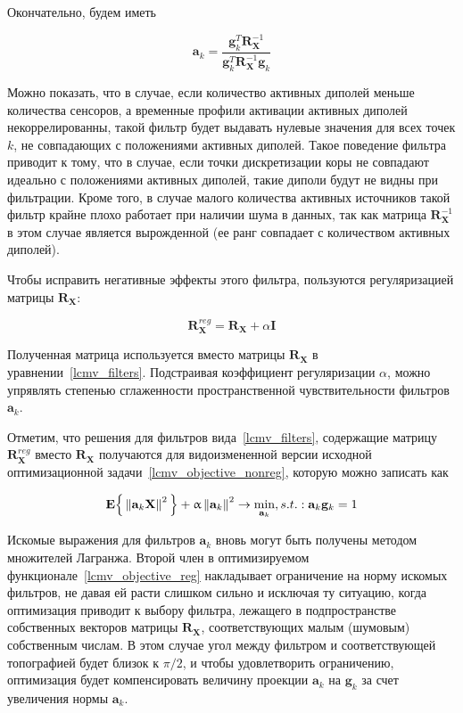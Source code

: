 Окончательно, будем иметь

\begin{equation}
    \mathbf{a}_k =
    \frac{\mathbf{g}_k^T \mathbf{R}_{\mathbf{X}}^{-1}}{\mathbf{g}_k^T \mathbf{R}_{\mathbf{X}}^{-1} \mathbf{g}_k}
    \label{lcmv_filters}
\end{equation}

Можно показать, что в случае, если количество активных диполей меньше количества сенсоров,
а временные профили активации активных диполей некоррелированны,
такой фильтр будет выдавать нулевые значения для всех точек $k$, не совпадающих
с положениями активных диполей.
Такое поведение фильтра приводит к тому, что в случае, если точки дискретизации коры не
совпадают идеально с положениями активных диполей, такие диполи будут не видны при
фильтрации.
Кроме того, в случае малого количества активных источников такой фильтр
крайне плохо работает при наличии шума в данных, так как матрица $\mathbf{R}_{\mathbf{X}}^{-1}$
в этом случае является вырожденной (ее ранг совпадает с количеством активных диполей).

Чтобы исправить негативные эффекты этого фильтра, пользуются регуляризацией матрицы $\mathbf{R}_{\mathbf{X}}$:

\begin{equation}
    \mathbf{R}_{\mathbf{X}}^{reg} = \mathbf{R}_\mathbf{X} + \alpha \mathbf{I}
\end{equation}

Полученная матрица используется вместо матрицы $\mathbf{R}_\mathbf{X}$ в
уравнении~\ref{lcmv_filters}. Подстраивая коэффициент регуляризации $\alpha$, можно упрявлять степенью
сглаженности пространственной чувствительности фильтров $\mathbf{a}_k$.


Отметим, что решения для фильтров вида~\ref{lcmv_filters},
содержащие матрицу $\mathbf{R}_\mathbf{X}^{reg}$ вместо $\mathbf{R}_\mathbf{X}$ получаются для
видоизмененной версии исходной оптимизационной задачи~\ref{lcmv_objective_nonreg},
которую можно записать как

\begin{equation}
    \mathbf{E}\Big\{\left\lVert\mathbf{a}_k \mathbf{X}\right\rVert^2\Big\} + \upalpha \left\lVert\mathbf{a}_k\right\rVert^2
    \rightarrow \underset{\mathbf{a}_k}{\min},
    s.t.: \mathbf{a}_k \mathbf{g}_k = 1
    \label{lcmv_objective_reg}
\end{equation}

Искомые выражения для фильтров $\mathbf{a}_k$ вновь могут быть получены методом
множителей Лагранжа.  Второй член в оптимизируемом
функционале~\ref{lcmv_objective_reg} накладывает ограничение на норму искомых
фильтров, не давая ей расти слишком сильно и исключая ту ситуацию, когда
оптимизация приводит к выбору фильтра, лежащего в подпространстве собственных
векторов матрицы $\mathbf{R}_\mathbf{X}$, соответствующих малым (шумовым)
собственным числам.  В этом случае угол между фильтром и соответствующей
топографией будет близок к $\pi/2$, и чтобы удовлетворить ограничению,
оптимизация будет компенсировать величину проекции $\mathbf{a}_k$ на
$\mathbf{g}_k$ за счет увеличения нормы $\mathbf{a}_k$.

